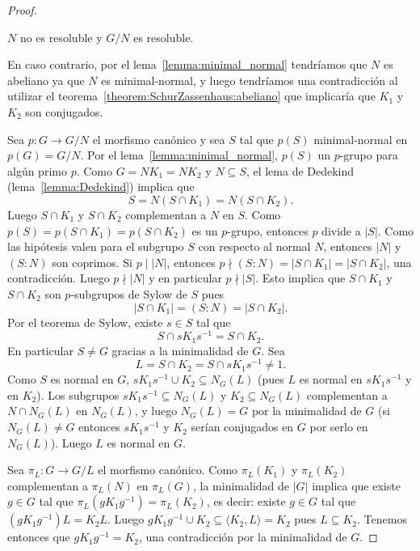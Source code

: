 \begin{proof}
	\begin{claim}
		$N$ no es resoluble y $G/N$ es resoluble. 
	\end{claim}
	
	En caso contrario, por el lema~\ref{lemma:minimal_normal} tendríamos que
	$N$ es abeliano ya que $N$ es minimal-normal, y luego tendríamos una
	contradicción al utilizar el teorema~\ref{theorem:SchurZassenhaus:abeliano}
	que implicaría que $K_1$ y $K_2$ son conjugados.

	\medskip
	Sea $p\colon G\to G/N$ el morfismo canónico y sea $S$ tal que $p(S)$
	minimal-normal en $p(G)=G/N$.  Por el lema~\ref{lemma:minimal_normal},
	$p(S)$ un $p$-grupo para algún primo $p$.  Como $G=NK_1=NK_2$ y $N\subseteq
	S$, el lema de Dedekind (lema~\ref{lemma:Dedekind}) implica que
	\[
	S=N(S\cap K_1)=N(S\cap K_2).
	\]
	Luego $S\cap K_1$ y $S\cap K_2$
	complementan a $N$ en $S$. Como $p(S)=p(S\cap K_1)=p(S\cap K_2)$ es un $p$-grupo,
	entonces $p$ divide a $|S|$. Como las hipótesis valen para el subgrupo $S$ con respecto al normal $N$,
	entonces $|N|$ y $(S:N)$ son coprimos. Si $p\mid |N|$, entonces 
	$p\nmid (S:N)=|S\cap K_1|=|S\cap K_2|$, una contradicción. Luego $p\nmid |N|$ y 
	en particular $p\nmid |S|$. Esto implica que $S\cap K_1$ y $S\cap K_2$ son
	$p$-subgrupos de Sylow de $S$ pues 
	\[
		|S\cap K_1|=(S:N)=|S\cap K_2|.
	\]
	Por el teorema de Sylow, existe $s\in
	S$ tal que \[
	S\cap sK_1s^{-1}=S\cap K_2.
	\]
	En particular $S\ne G$ gracias a la minimalidad de $G$.
	Sea 
	\[
		L=S\cap K_2=S\cap sK_1s^{-1}\ne1.
	\]
	Como $S$ es normal en $G$, $sK_1s^{-1}\cup K_2\subseteq N_G(L)$ (pues $L$
	es normal en $sK_1s^{-1}$ y en $K_2$). Los subgrupos $sK_1s^{-1}\subseteq
	N_G(L)$ y $K_2\subseteq N_G(L)$ complementan a $N\cap N_G(L)$ en $N_G(L)$, y luego
	$N_G(L)=G$ por la minimalidad de $G$ (si $N_G(L)\ne G$ entonces
	$sK_1s^{-1}$ y $K_2$ serían conjugados en $G$ por serlo en $N_G(L)$). Luego
	$L$ es normal en $G$. 
	
	Sea $\pi_L\colon G\to G/L$ el morfismo canónico. Como
	$\pi_L(K_1)$ y $\pi_L(K_2)$ complementan a $\pi_L(N)$ en $\pi_L(G)$, la minimalidad
	de $|G|$ implica que existe $g\in G$ tal que $\pi_L(gK_1g^{-1})=\pi_L(K_2)$, es
	decir: existe $g\in G$ tal que $(gK_1g^{-1})L=K_2L$.  Luego $gK_1g^{-1}\cup
	K_2\subseteq \langle K_2,L\rangle=K_2$ pues $L\subseteq K_2$. Tenemos entonces que
	$gK_1g^{-1}=K_2$, una contradicción por la minimalidad de $G$. 
%
\end{proof}


